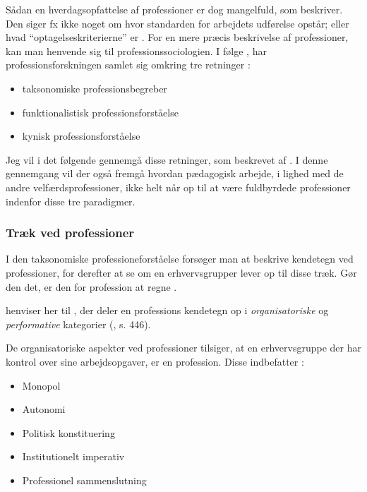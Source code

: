 Sådan en hverdagsopfattelse af professioner er dog mangelfuld, som \citeauthor{frederiksenVelfaerdsprofessionerMellemOmsorg2017} beskriver. Den siger fx ikke noget om hvor standarden for arbejdets udførelse opstår; eller hvad “optagelseskriterierne” er \autocite[s. 445]{frederiksenVelfaerdsprofessionerMellemOmsorg2017}.
For en mere præcis beskrivelse af professioner, kan man henvende sig til professionssociologien. I følge \citeauthor{frederiksenVelfaerdsprofessionerMellemOmsorg2017}, har professionsforskningen samlet sig omkring tre retninger \autocite[s. 445]{frederiksenVelfaerdsprofessionerMellemOmsorg2017}:
\begin{itemize}
  \item
    taksonomiske professionsbegreber
  \item
    funktionalistisk professionsforståelse
  \item
    kynisk professionsforståelse
\end{itemize}

Jeg vil i det følgende gennemgå disse retninger, som beskrevet af \citeauthor{frederiksenVelfaerdsprofessionerMellemOmsorg2017}.
I denne gennemgang vil der også fremgå hvordan pædagogisk arbejde, i lighed med de andre velfærdsprofessioner, ikke helt når op til at være fuldbyrdede professioner indenfor disse tre paradigmer.

\subsubsection{Træk ved professioner}
I den taksonomiske professioneforståelse forsøger man at beskrive kendetegn ved professioner, for derefter at se om en erhvervsgrupper lever op til disse træk.
Gør den det, er den for profession at regne \autocite[s.446]{frederiksenVelfaerdsprofessionerMellemOmsorg2017}.

\citeauthor{frederiksenVelfaerdsprofessionerMellemOmsorg2017} henviser her til \citeauthor{molanderProfesjonsstudierIntroduksjon2008}, der deler en professions kendetegn op i \textit{organisatoriske} og \textit{performative} kategorier (\citeyear{frederiksenVelfaerdsprofessionerMellemOmsorg2017}, s. 446).

De organisatoriske aspekter ved professioner tilsiger, at en erhvervsgruppe der har kontrol over sine arbejdsopgaver, er en profession. Disse indbefatter \autocite[s. 18ff]{molanderProfesjonsstudierIntroduksjon2008}:
\begin{itemize}
  \item
    Monopol
  \item
    Autonomi
  \item
    Politisk konstituering
  \item
    Institutionelt imperativ
  \item
    Professionel sammenslutning
\end{itemize}

